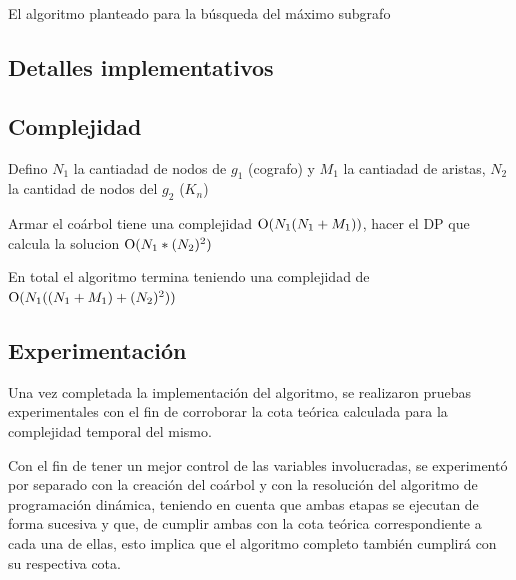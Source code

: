 El algoritmo planteado para la búsqueda del máximo subgrafo


\subsection{Detalles implementativos}

\subsection{Complejidad}
Defino $N_1$ la cantiadad de nodos de $g_1$ (cografo) y $M_1$ la cantiadad de aristas,
$N_2$ la cantidad de nodos del $g_2$ ($K_n$)

Armar el coárbol tiene una complejidad $\operatorname{O}(N_1(N_1 + M_1))$, hacer el DP que
calcula la solucion $\operatorname{O}(N_1 * (N_2)^2 )$

En total el algoritmo termina teniendo una complejidad de $\operatorname{O}(N_1((N_1 + M_1) + (N_2)^2 ))$

\subsection{Experimentación}
Una vez completada la implementación del algoritmo, se realizaron pruebas
experimentales con el fin de corroborar la cota teórica calculada para la
complejidad temporal del mismo.

Con el fin de tener un mejor control de las variables involucradas, se
experimentó por separado con la creación del coárbol y con la resolución del
algoritmo de programación dinámica, teniendo en cuenta que ambas etapas se
ejecutan de forma sucesiva y que, de cumplir ambas con la cota teórica
correspondiente a cada una de ellas, esto implica que el algoritmo completo
también cumplirá con su respectiva cota.


